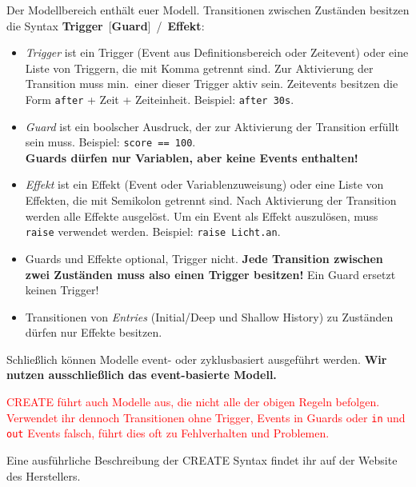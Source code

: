 Der Modellbereich enthält euer Modell. Transitionen zwischen Zuständen besitzen die Syntax
\textbf{Trigger} \,[\textbf{Guard}] \,/\, \textbf{Effekt}:

\begin{itemize}[leftmargin=*, itemsep=0.5em]
  \item \emph{Trigger} ist ein Trigger (Event aus Definitionsbereich oder Zeitevent) oder eine Liste von Triggern,
  die mit Komma getrennt sind. Zur Aktivierung der Transition muss min.\ einer dieser Trigger aktiv sein.
  Zeitevents besitzen die Form \texttt{after} + Zeit + Zeiteinheit. Beispiel: \texttt{after 30s}.

  \item \emph{Guard} ist ein boolscher Ausdruck, der zur Aktivierung der Transition erfüllt sein muss.
  Beispiel: \texttt{score == 100}.\\
  \textbf{Guards dürfen nur Variablen, aber keine Events enthalten!}

  \item \emph{Effekt} ist ein Effekt (Event oder Variablenzuweisung) oder eine Liste von Effekten,
  die mit Semikolon getrennt sind. Nach Aktivierung der Transition werden alle Effekte ausgelöst.
  Um ein Event als Effekt auszulösen, muss \texttt{raise} verwendet werden.
  Beispiel: \texttt{raise Licht.an}.

  \item Guards und Effekte optional, Trigger nicht.
  \textbf{Jede Transition zwischen zwei Zuständen muss also einen Trigger besitzen!}
  Ein Guard ersetzt keinen Trigger!

  \item Transitionen von \emph{Entries} (Initial/Deep und Shallow History) zu Zuständen dürfen nur Effekte besitzen.
\end{itemize}

Schließlich können Modelle event- oder zyklusbasiert ausgeführt werden.
\textbf{Wir nutzen ausschließlich das event-basierte Modell.}

\vspace{1em}

\textcolor{red}{CREATE führt auch Modelle aus, die nicht alle der obigen Regeln befolgen.
Verwendet ihr dennoch Transitionen ohne Trigger, Events in Guards oder \texttt{in} und \texttt{out} Events falsch,
führt dies oft zu Fehlverhalten und Problemen.}

\vspace{1em}

Eine ausführliche Beschreibung der CREATE Syntax findet ihr auf der Website des Herstellers.

